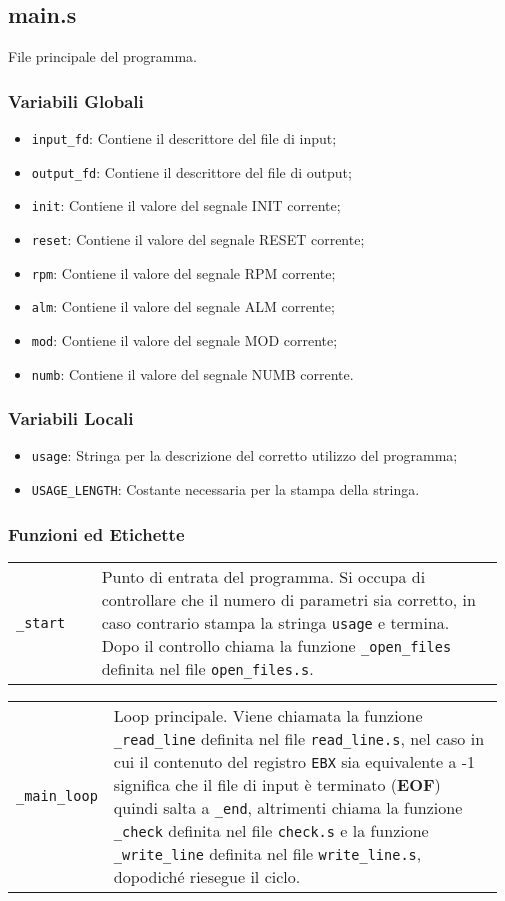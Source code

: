 \documentclass[a4paper,11pt]{article}
\newcommand{\myparagraph}[2]{
	\begin{table}[!ht]
		\begin{tabular}{p{0.17\linewidth} | p{0.8\linewidth}}
			\texttt{#1} & #2
		\end{tabular}
	\end{table}
			}
\begin{document}
	\subsection{main.s}
	File principale del programma. 
		\subsubsection{Variabili Globali}
		\begin{itemize}
			\item \texttt{input\_fd}: Contiene il descrittore del file di input;
			\item \texttt{output\_fd}: Contiene il descrittore del file di output;
			\item \texttt{init}: Contiene il valore del segnale INIT corrente;
			\item \texttt{reset}: Contiene il valore del segnale RESET corrente;
			\item \texttt{rpm}: Contiene il valore del segnale RPM corrente;
			\item \texttt{alm}: Contiene il valore del segnale ALM corrente;
			\item \texttt{mod}: Contiene il valore del segnale MOD corrente;
			\item \texttt{numb}: Contiene il valore del segnale NUMB corrente.
		\end{itemize}
		\subsubsection{Variabili Locali}
	\begin{itemize}
		\item \texttt{usage}: Stringa per la descrizione del corretto utilizzo del programma;
		\item \texttt{USAGE\_LENGTH}: Costante necessaria per la stampa della stringa.
	\end{itemize}
	
		\subsubsection{Funzioni ed Etichette}
		
		\myparagraph{\_start}{Punto di entrata del programma. Si occupa di controllare che il numero di parametri sia corretto, in caso contrario stampa la stringa \texttt{usage} e termina. Dopo il controllo chiama la funzione \texttt{\_open\_files} definita nel file \texttt{open\_files.s}.}
		
		\myparagraph{\_main\_loop}{Loop principale. Viene chiamata la funzione \texttt{\_read\_line} definita nel file \texttt{read\_line.s}, nel caso in cui il contenuto del registro \texttt{EBX} sia equivalente a -1 significa che il file di input è terminato (\textbf{EOF}) quindi salta a \texttt{\_end}, altrimenti chiama la funzione \texttt{\_check} definita nel file \texttt{check.s} e la funzione \texttt{\_write\_line} definita nel file \texttt{write\_line.s}, dopodiché riesegue il ciclo.}
		
\end{document}
